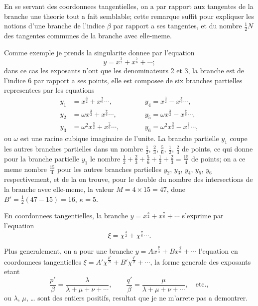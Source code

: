 \documentclass[11pt,a4paper]{article}
\theoremstyle{plain}
\begin{document}
En se servant des coordonnees tangentielles, on a par rapport aux tangentes de la branche une theorie tout a fait semblable; cette remarque suffit pour expliquer les notions d'une branche de l'indice $\beta$ par rapport a ses tangentes, et du nombre $\frac12 N$ des tangentes communes de la branche avec elle-meme.

\smallskip

Comme exemple je prends la singularite donnee par l'equation
\[
y = x^{\frac32} + x^{\frac76} + \cdots;
\]
dans ce cas les exposants n'ont que les denominateurs 2 et 3, la branche est de l'indice 6 par rapport a ses points, elle est composee de six branches partielles representees par les equations
\begin{align*}
y_1 &= x^{\frac32} + x^{\frac76} \cdots, \qquad &&y_4 = x^{\frac32} - x^{\frac76} \cdots, \\
y_2 &= \omega x^{\frac32} + x^{\frac76} \cdots, \qquad &&y_5 = \omega x^{\frac32} - x^{\frac76} \cdots, \\
y_3 &= \omega^2 x^{\frac32} + x^{\frac76} \cdots, \qquad &&y_6 = \omega^2 x^{\frac32} - x^{\frac76} \cdots,
\end{align*}
ou $\omega$ est une racine cubique imaginaire de l'unite. La branche partielle $y_1$ coupe les autres branches partielles dans un nombre $\frac12$, $\frac23$, $\frac56$, $\frac12$, $\frac23$ de points, ce qui donne pour la branche partielle $y_1$ le nombre $\frac12 + \frac23 + \frac56 + \frac12 + \frac23 = \frac{15}{4}$ de points; on a ce meme nombre $\frac{15}{4}$ pour les autres branches partielles $y_2$, $y_3$, $y_4$, $y_5$, $y_6$ respectivement, et de la on trouve, pour le double du nombre des intersections de la branche avec elle-meme, la valeur $M = 4 \times 15 = 47$, done $B' = \frac12(47 - 15) = 16$, $\kappa = 5$.

\smallskip

En coordonnees tangentielles, la branche $y = x^{\frac32} + x^{\frac76} + \cdots$ s'exprime par l'equation
\[
\xi = \chi^{\frac32} + \chi^{\frac76} \cdots.
\]

\smallskip

Plus generalement, on a pour une branche $y = A x^{\frac{p}{\alpha}} + B x^{\frac{q}{\alpha}} + \cdots$ l'equation en coordonnees tangentielles $\xi = A' \chi^{\frac{p'}{\beta}} + B' \chi^{\frac{q'}{\beta}} + \cdots$, la forme generale des exposants etant
\[
\frac{p'}{\beta} = \frac{\lambda}{\lambda + \mu + \nu + \cdots}, \qquad
\frac{q'}{\beta} = \frac{\mu}{\lambda + \mu + \nu + \cdots}, \quad \text{etc.},
\]
ou $\lambda$, $\mu$, \ldots{} sont des entiers positifs, resultat que je ne m'arrete pas a demontrer.
\end{document}
